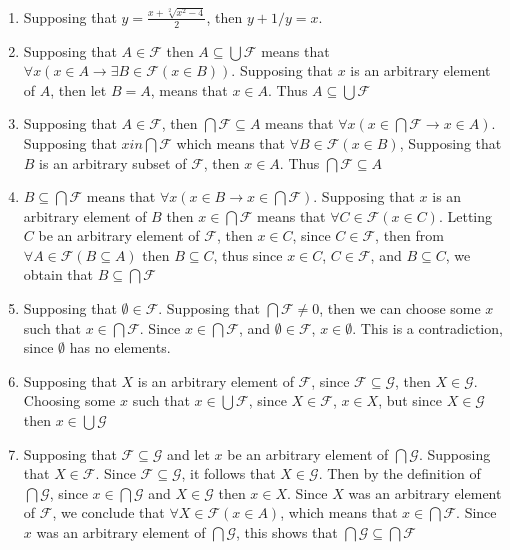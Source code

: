 \begin{enumerate}
\begin{enumerate}
    \end{enumerate}
    \item
    Supposing that $y = \frac{x + \sqrt[2]{x^2 - 4}}{2}$, then $y +1/y = x$.
    \item
    Supposing that $A \in \mathscr{F}$ then $A \subseteq \bigcup \mathscr{F}$ means that $\forall x(x \in A \rightarrow \exists B \in \mathscr{F} (x \in B))$. Supposing that $x$ is an arbitrary element of $A$, then let $B = A$, means that $x \in A$. Thus $A \subseteq \bigcup \mathscr{F}$
    \item
    Supposing that $A \in \mathscr{F}$, then $\bigcap \mathscr{F} \subseteq A$ means that $\forall x (x \in \bigcap \mathscr{F} \rightarrow x \in A)$. Supposing that $x in \bigcap \mathscr{F}$ which means that $\forall B \in \mathscr{F} (x \in B)$, Supposing that $B$ is an arbitrary subset of $\mathscr{F}$, then $x \in A$. Thus $\bigcap \mathscr{F} \subseteq A$
    \item
    $B \subseteq \bigcap \mathscr{F}$ means that $\forall x (x \in B \rightarrow x \in \bigcap \mathscr{F})$. Supposing that $x$ is an arbitrary element of $B$ then $x \in \bigcap \mathscr{F}$ means that $\forall C \in \mathscr{F} (x \in C)$. Letting $C$ be an arbitrary element of $\mathscr{F}$, then $x \in C$, since $C \in \mathscr{F}$, then from $\forall A \in \mathscr{F} (B \subseteq A)$ then $B \subseteq C$, thus since $x \in C$, $C \in \mathscr{F}$, and $B \subseteq C$, we obtain that $B \subseteq \bigcap \mathscr{F}$
    \item
    Supposing that $\emptyset \in \mathscr{F}$. Supposing that $\bigcap \mathscr{F} \neq 0$, then we can choose some $x$ such that $x \in \bigcap \mathscr{F}$. Since $x \in \bigcap \mathscr{F}$, and $\emptyset \in \mathscr{F}$, $x \in \emptyset$. This is a contradiction, since $\emptyset$ has no elements.
    \item
    Supposing that $X$ is an arbitrary element of $\mathscr{F}$, since $\mathscr{F} \subseteq \mathscr{G}$, then $X \in \mathscr{G}$. Choosing some $x$ such that $x \in \bigcup \mathscr{F}$, since $X \in \mathscr{F}$, $x \in X$, but since $X \in \mathscr{G}$ then $x \in \bigcup \mathscr{G}$
    \item
    Supposing that $\mathscr{F} \subseteq \mathscr{G}$ and let $x$ be an arbitrary element of $\bigcap \mathscr{G}$. Supposing that $X \in \mathscr{F}$. Since $\mathscr{F} \subseteq \mathscr{G}$, it follows that $X \in \mathscr{G}$. Then by the definition of $\bigcap \mathscr{G}$, since $x \in \bigcap \mathscr{G}$ and $X \in \mathscr{G}$ then $x \in X$. Since $X$ was an arbitrary element of $\mathscr{F}$, we conclude that $\forall X \in \mathscr{F}(x \in A)$, which means that $x \in \bigcap \mathscr{F}$. Since $x$ was an arbitrary element of $\bigcap \mathscr{G}$, this shows that $\bigcap \mathscr{G} \subseteq \bigcap \mathscr{F}$

\end{enumerate}
